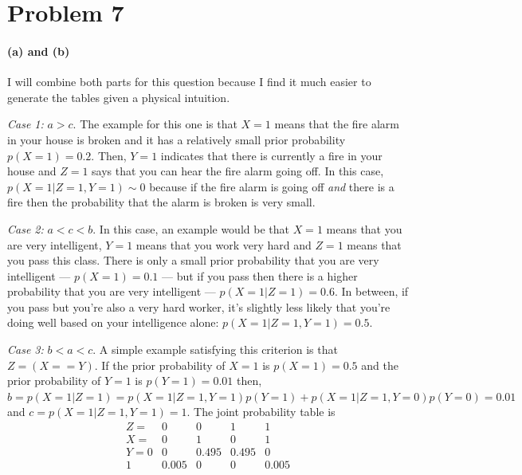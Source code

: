 \documentclass[11pt]{article}
\newcommand{\pr}[1]{\ensuremath{p(#1)}}
\begin{document}
\section{Problem 7}

\paragraph{(a) and (b)}

I will combine both parts for this question because I find it much easier
to generate the tables given a physical intuition.

\emph{Case 1:} $a > c$. The example for this one is that $X = 1$ means that
the fire alarm in your house is broken and it has a relatively small
prior probability $\pr{X=1} = 0.2$. Then, $Y=1$ indicates that there is
currently a fire in your house and $Z=1$ says that you can hear the fire
alarm going off. In this case, $\pr{X = 1|Z=1, Y=1} \sim 0$ because if the
fire alarm is going off \emph{and} there is a fire then the probability
that the alarm is broken is very small.

\emph{Case 2:} $a < c < b$. In this case, an example would be that
$X=1$ means that you are very intelligent, $Y = 1$ means that you
work very hard and $Z = 1$ means that you pass this class. There is
only a small prior probability that you are very intelligent ---
$\pr{X=1} = 0.1$ --- but if you pass then there is a higher
probability that you are very intelligent --- $\pr{X=1|Z=1} = 0.6$. In
between, if you pass but you're also a very hard worker, it's slightly
less likely that you're doing well based on your intelligence alone:
$\pr{X=1|Z=1,Y=1} = 0.5$.

\emph{Case 3:} $b < a < c$. A simple example satisfying this criterion is
that $Z = (X==Y)$. If the prior probability of $X=1$ is $\pr{X=1} = 0.5$
and the prior probability of $Y=1$ is $\pr{Y=1} = 0.01$ then,
$b = \pr{X=1|Z=1} = \pr{X=1|Z=1,Y=1}\pr{Y=1} + \pr{X=1|Z=1,Y=0}\pr{Y=0} = 0.01$
and $c = \pr{X=1|Z=1, Y=1} = 1$. The joint probability table is
\begin{equation}
    \begin{array}{r|cccc}
        Z =   & 0   & 0     & 1    & 1 \\
        X =   & 0   & 1     & 0    & 1 \\\hline
        Y = 0 & 0   & 0.495 & 0.495 & 0 \\
            1 & 0.005 & 0     & 0    & 0.005 \\
    \end{array}
\end{equation}
\end{document}
